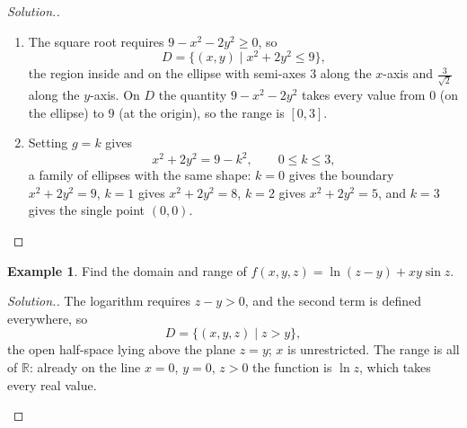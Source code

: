 \documentclass[11pt,a4paper]{article}
\theoremstyle{definition}
\newtheorem{exa}[thm]{Example}
\newenvironment{solution}
  {\renewcommand{\qedsymbol}{}\begin{proof}[\textit{Solution}.]}
  {\end{proof}}
\begin{document}
\begin{solution}
\begin{enumerate}
\item The square root requires $9 - x^2 - 2y^2\geq 0$, so
\[D = \{(x,y) \mid x^2 + 2y^2 \leq 9\},\]
the region inside and on the ellipse with semi-axes $3$ along the $x$-axis and
$\frac{3}{\sqrt2}$ along the $y$-axis. On $D$ the quantity $9 - x^2 - 2y^2$ takes
every value from $0$ (on the ellipse) to $9$ (at the origin), so the range is
$[0,3]$.

\item Setting $g = k$ gives
\[x^2 + 2y^2 = 9 - k^2 ,\qquad 0\leq k\leq 3,\]
a family of ellipses with the same shape: $k = 0$ gives the boundary
$x^2 + 2y^2 = 9$, $k = 1$ gives $x^2 + 2y^2 = 8$, $k = 2$ gives
$x^2 + 2y^2 = 5$, and $k = 3$ gives the single point $(0,0)$.

\begin{figure}[H]
\centering
{}
\end{figure}
\end{enumerate}
\end{solution}

\begin{exa}
\label{ex:domainln}
Find the domain and range of $f(x,y,z) = \ln (z-y) + xy\sin z$.
\end{exa}

\begin{solution}
The logarithm requires $z - y > 0$, and the second term is defined everywhere,
so
\[D = \{(x,y,z) \mid z > y\},\]
the open half-space lying above the plane $z = y$; $x$ is unrestricted. The
range is all of $\mathbb{R}$: already on the line $x = 0$, $y = 0$, $z>0$ the
function is $\ln z$, which takes every real value.

\begin{figure}[H]
\centering
{}
\end{figure}
\end{solution}
\end{document}
